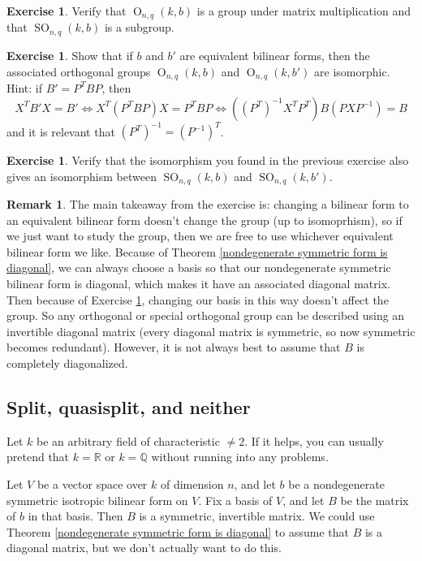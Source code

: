 \documentclass[12pt]{article}
\theoremstyle{definition}
\newtheorem{remark}[theorem]{Remark}
\newtheorem{exercise}[theorem]{Exercise}
\numberwithin{theorem}{subsection}
\newcommand{\Q}{\mathbb{Q}}
\newcommand{\R}{\mathbb{R}}
\newcommand{\lp}{\left(}
\newcommand{\rp}{\right)}
\newcommand{\inv}{^{-1}}
\DeclareMathOperator{\OO}{O}
\DeclareMathOperator{\SO}{SO}
\begin{document}
\begin{exercise}
Verify that $\OO_{n,q}(k,b)$ is a group under matrix multiplication and that $\SO_{n,q}(k,b)$ is a subgroup.
\end{exercise}

\begin{exercise}
\label{equivalent forms give isomorphic groups}
Show that if $b$ and $b'$ are equivalent bilinear forms, then the associated orthogonal groups $\OO_{n,q}(k,b)$ and $\OO_{n,q}(k,b')$ are isomorphic. Hint: if $B' = P^T B P$, then
\[
	X^T B' X = B' \iff X^T \lp P^T BP \rp X = P^T BP \iff \lp (P^T) \inv X^T P^T \rp B \lp P X P \inv \rp = B
\]
and it is relevant that $(P^T) \inv = (P \inv)^T$.
\end{exercise}

\begin{exercise}
Verify that the isomorphism you found in the previous exercise also gives an isomorphism between $\SO_{n,q}(k,b)$ and $\SO_{n,q}(k,b')$.
\end{exercise}

\begin{remark}
The main takeaway from the exercise is: changing a bilinear form to an equivalent bilinear form doesn't change the group (up to isomoprhism), so if we just want to study the group, then we are free to use whichever equivalent bilinear form we like. Because of Theorem \ref{nondegenerate symmetric form is diagonal}, we can always choose a basis so that our nondegenerate symmetric bilinear form is diagonal, which makes it have an associated diagonal matrix. Then because of Exercise \ref{equivalent forms give isomorphic groups}, changing our basis in this way doesn't affect the group. So any orthogonal or special orthogonal group can be described using an invertible diagonal matrix (every diagonal matrix is symmetric, so now symmetric becomes redundant). However, it is not always best to assume that $B$ is completely diagonalized.
\end{remark}

\subsection{Split, quasisplit, and neither}

Let $k$ be an arbitrary field of characteristic $\neq 2$. If it helps, you can usually pretend that $k = \R$ or $k = \Q$ without running into any problems. 

Let $V$ be a vector space over $k$ of dimension $n$, and let $b$ be a nondegenerate symmetric isotropic bilinear form on $V$. Fix a basis of $V$, and let $B$ be the matrix of $b$ in that basis. Then $B$ is a symmetric, invertible matrix. We could use Theorem \ref{nondegenerate symmetric form is diagonal} to assume that $B$ is a diagonal matrix, but we don't actually want to do this.
\end{document}
